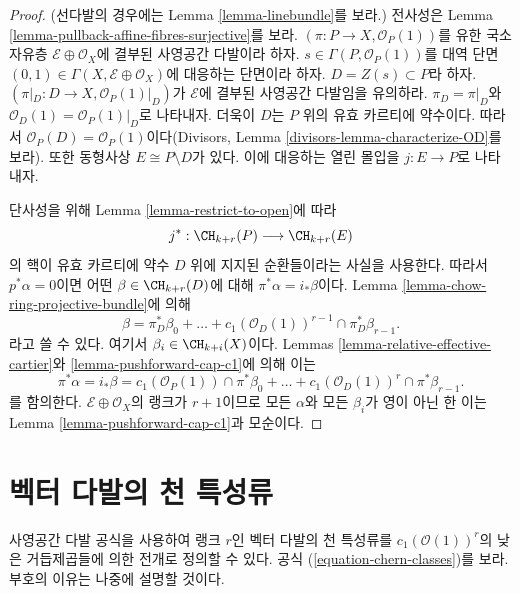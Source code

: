 \begin{proof}
(선다발의 경우에는 Lemma \ref{lemma-linebundle}를 보라.) 전사성은
Lemma \ref{lemma-pullback-affine-fibres-surjective}를 보라.
$(\pi  : P \to X, \mathcal{O}_P(1))$를 유한 국소 자유층
$\mathcal{E} \oplus \mathcal{O}_X$에 결부된 사영공간 다발이라 하자.
$s \in \Gamma(P, \mathcal{O}_P(1))$를 대역 단면
$(0, 1) \in \Gamma(X, \mathcal{E} \oplus \mathcal{O}_X)$에 대응하는
단면이라 하자. $D = Z(s) \subset P$라 하자.
$(\pi|_D : D \to X , \mathcal{O}_P(1)|_D)$가 $\mathcal{E}$에 결부된
사영공간 다발임을 유의하라. $\pi_D = \pi|_D$와
$\mathcal{O}_D(1) = \mathcal{O}_P(1)|_D$로 나타내자. 더욱이 $D$는 $P$
위의 유효 카르티에 약수이다. 따라서
$\mathcal{O}_P(D) = \mathcal{O}_P(1)$이다(Divisors, Lemma
\ref{divisors-lemma-characterize-OD}를 보라). 또한 동형사상
$E \cong P \setminus D$가 있다. 이에 대응하는 열린 몰입을
$j : E \to P$로 나타내자.

단사성을 위해 Lemma \ref{lemma-restrict-to-open}에 따라
$$
j^* :
\CH_{k + r}(P)
\longrightarrow
\CH_{k + r}(E)
$$
의 핵이 유효 카르티에 약수 $D$ 위에 지지된 순환들이라는 사실을
사용한다. 따라서 $p^*\alpha = 0$이면 어떤
$\beta \in \CH_{k + r}(D)$에 대해 $\pi^*\alpha = i_*\beta$이다.
Lemma \ref{lemma-chow-ring-projective-bundle}에 의해
$$
\beta = \pi_D^*\beta_0 +
\ldots + c_1(\mathcal{O}_D(1))^{r - 1} \cap \pi_D^* \beta_{r - 1}.
$$
라고 쓸 수 있다. 여기서 $\beta_i \in \CH_{k + i}(X)$이다. Lemmas
\ref{lemma-relative-effective-cartier}와
\ref{lemma-pushforward-cap-c1}에 의해 이는
$$
\pi^*\alpha = i_*\beta =
c_1(\mathcal{O}_P(1)) \cap \pi^*\beta_0 +
\ldots +
c_1(\mathcal{O}_D(1))^r \cap \pi^*\beta_{r - 1}.
$$
를 함의한다. $\mathcal{E} \oplus \mathcal{O}_X$의 랭크가 $r + 1$이므로
모든 $\alpha$와 모든 $\beta_i$가 영이 아닌 한 이는 Lemma
\ref{lemma-pushforward-cap-c1}과 모순이다.
\end{proof}








\section{벡터 다발의 천 특성류}
\label{section-chern-classes-vector-bundles}

\noindent
사영공간 다발 공식을 사용하여 랭크 $r$인 벡터 다발의 천 특성류를
$c_1(\mathcal{O}(1))^r$의 낮은 거듭제곱들에 의한 전개로 정의할 수
있다. 공식 (\ref{equation-chern-classes})를 보라. 부호의 이유는 나중에
설명할 것이다.

